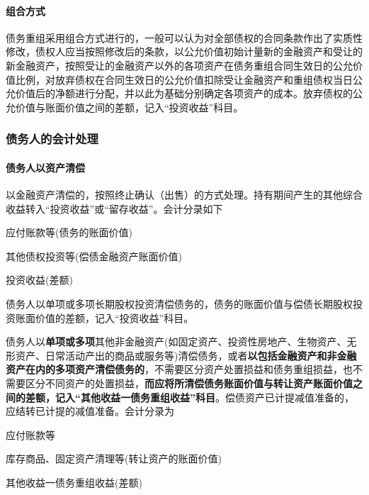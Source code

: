 \documentclass[UTF8,12pt]{ctexart}
\newenvironment{Dr}{%
	\begin{list}{}%
		{
			\setlength{\leftmargin}{2em}
			\setlength{\labelwidth}{2em}
			\setlength{\labelsep}{0pt}
			\setlength{\itemindent}{0pt}
			\setlength{\listparindent}{0pt}
			\setlength{\parsep}{0pt}
			\setlength{\topsep}{0pt}
		}
		\item[\textbf{借：}]
	}{%
	\end{list}
}
\newenvironment{Cr}{%
	\begin{list}{}%
		{
			\setlength{\leftmargin}{3em}
			\setlength{\labelwidth}{2em}
			\setlength{\labelsep}{0pt}
			\setlength{\itemindent}{0pt}
			\setlength{\listparindent}{0pt}
			\setlength{\parsep}{0pt}
			\setlength{\topsep}{0pt}
		}
		\item[\textbf{贷：}]
	}{%
	\end{list}
}
\numberwithin{equation}{section} %
\numberwithin{figure}{section}
\numberwithin{table}{section}
\begin{document}
	\paragraph{组合方式}
	债务重组采用组合方式进行的，一般可以认为对全部债权的合同条款作出了实质性修改，债权人应当按照修改后的条款，以公允价值初始计量新的金融资产和受让的新金融资产，按照受让的金融资产以外的各项资产在债务重组合同生效日的公允价值比例，对放弃债权在合同生效日的公允价值扣除受让金融资产和重组债权当日公允价值后的净额进行分配，并以此为基础分别确定各项资产的成本。放弃债权的公允价值与账面价值之间的差额，记入“投资收益”科目。
	
	\subsubsection{债务人的会计处理}
	
	\paragraph{债务人以资产清偿}
	以金融资产清偿的，按照终止确认（出售）的方式处理。持有期间产生的其他综合收益转入“投资收益”或“留存收益”。会计分录如下
	\begin{Dr}
		应付账款等(债务的账面价值)
	\end{Dr}
	\begin{Cr}
		其他债权投资等(偿债金融资产账面价值)
		
		投资收益(差额)
	\end{Cr}
	
	债务人以单项或多项长期股权投资清偿债务的，债务的账面价值与偿债长期股权投资账面价值的差额，记入“投资收益”科目。
	
	债务人以\textbf{单项或多项}其他非金融资产(如固定资产、投资性房地产、生物资产、无形资产、日常活动产出的商品或服务等)清偿债务，或者\textbf{以包括金融资产和非金融资产在内的多项资产清偿债务的}，不需要区分资产处置损益和债务重组损益，也不需要区分不同资产的处置损益，\textbf{而应将所清偿债务账面价值与转让资产账面价值之间的差额，记入“其他收益一债务重组收益”科目}。偿债资产已计提减值准备的，应结转已计提的减值准备。会计分录为
	\begin{Dr}
		应付账款等
	\end{Dr}
	\begin{Cr}
		库存商品、固定资产清理等(转让资产的账面价值)
		
		其他收益一债务重组收益(差额)
	\end{Cr}
	
\end{document}
